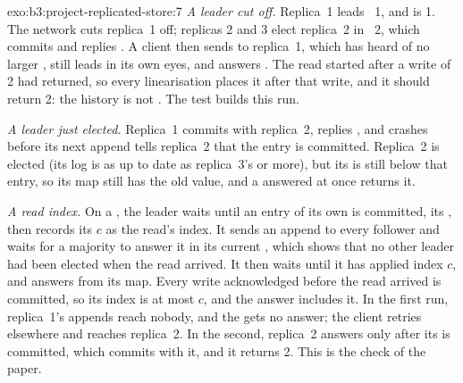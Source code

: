 \begin{solution}{exo:b3:project-replicated-store:7}
\emph{A leader cut off.} Replica~1 leads ~1, and  is 1. The network cuts replica~1 off; replicas 2 and 3 elect replica~2 in ~2, which commits  and replies . A client then sends  to replica~1, which has heard of no larger , still leads in its own eyes, and answers . The read started after a write of 2 had returned, so every linearisation places it after that write, and it should return 2: the history is not . The test  builds this run.

\emph{A leader just elected.} Replica~1 commits  with replica~2, replies , and crashes before its next append tells replica~2 that the entry is committed. Replica~2 is elected (its log is as up to date as replica~3's or more), but its  is still below that entry, so its map still has the old value, and a  answered at once returns it.

\emph{A read index.} On a , the leader waits until an entry of its own  is committed, its , then records its  $c$ as the read's index. It sends an append to every follower and waits for a majority to answer it in its current , which shows that no other leader had been elected when the read arrived. It then waits until it has applied index $c$, and answers from its map. Every write acknowledged before the read arrived is committed, so its index is at most $c$, and the answer includes it. In the first run, replica~1's appends reach nobody, and the  gets no answer; the client retries elsewhere and reaches replica~2. In the second, replica~2 answers only after its  is committed, which commits  with it, and it returns 2. This is the check of the  paper.
\end{solution}


